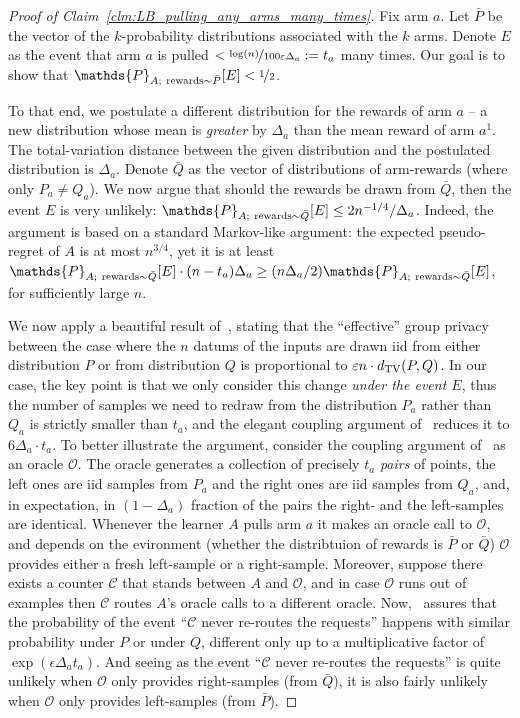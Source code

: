 \documentclass{article}
\renewcommand{\Pr}{\mathds{P}}
\begin{document}
\begin{proof}[Proof of Claim~\ref{clm:LB_pulling_any_arms_many_times}]
Fix arm $a$. Let $\bar P$ be the vector of the $k$-probability distributions associated with the $k$ arms. Denote $E$ as the event that arm $a$ is pulled $<\nicefrac{\log(n)}{100\varepsilon\Delta_a} := t_a$ many times. Our goal is to show that $\Pr_{A;~{\rm rewards}\sim \bar P}[E]<\nicefrac 1 2$.

To that end, we postulate a different distribution for the rewards of
arm $a$ -- a new distribution whose mean is \emph{greater} by
$\Delta_a$ than the mean reward of arm $a^1$. The total-variation
distance between the given distribution and the postulated
distribution is $\Delta_a$. Denote $\bar Q$ as the vector of
distributions of arm-rewards (where only $P_a \neq Q_a$). We now argue
that should the rewards be drawn from $\bar Q$, then the event $E$ is
very unlikely: $\Pr_{A;~{\rm rewards}\sim \bar Q}[E] \leq 2n^{-1/4}/\Delta_a$. Indeed, the argument is based on a standard Markov-like argument: the expected pseudo-regret of $A$ is at most $n^{3/4}$, yet it is at least $\Pr_{A;~{\rm rewards}\sim \bar Q}[E]\cdot (n-t_a) \Delta_a \geq  (n\Delta_a/2)\Pr_{A;~{\rm rewards}\sim \bar Q}[E]$, for sufficiently large $n$.


We now apply a beautiful result of~\citet[Lemma~6.1]{KarwaVadhanFiniteSampleDP2017}, stating that the ``effective'' group privacy between the case where the $n$ datums of the inputs are drawn iid from either distribution $P$ or from distribution $Q$ is proportional to $\varepsilon n\cdot d_{\rm TV}(P,Q)$. In our case, the key point is that we only consider this change \emph{under the event $E$}, thus the number of samples we need to redraw from the distribution $P_a$ rather than $Q_a$ is strictly smaller than $t_a$, and the elegant coupling argument of~\cite{KarwaVadhanFiniteSampleDP2017} reduces it to $6\Delta_a \cdot t_a$. To better illustrate the argument, consider the coupling argument of~\cite{KarwaVadhanFiniteSampleDP2017} as an oracle $\mathcal{O}$. The oracle generates a collection of precisely $t_a$ \emph{pairs} of points, the left ones are iid samples from $P_a$ and the right ones are iid samples from $Q_a$, and, in expectation, in $(1-\Delta_a)$ fraction of the pairs the right- and the left-samples are identical. Whenever the learner $A$ pulls arm $a$ it makes an oracle call to $\mathcal{O}$, and depends on the evironment (whether the distribtuion of rewards is $\bar P$ or $\bar Q$) $\mathcal{O}$ provides either a fresh left-sample or a right-sample. Moreover, suppose there exists a counter $\mathcal{C}$ that stands between $A$ and $\mathcal{O}$, and in case $\mathcal{O}$ runs out of examples then $\mathcal{C}$ routes $A$'s oracle calls to a different oracle. Now,~\citet[Lemma~6.1]{KarwaVadhanFiniteSampleDP2017} assures that the probability of the event ``$\mathcal{C}$ never re-routes the requests'' happens with similar probability under $P$ or under $Q$, different only up to a multiplicative factor of $\exp(\epsilon \Delta_a t_a)$. And seeing as the event ``$\mathcal{C}$ never re-routes the requests'' is quite unlikely when $\mathcal{O}$ only provides right-samples (from $\bar Q$), it is also fairly unlikely when $\mathcal{O}$ only provides left-samples (from $\bar P$).


\end{proof}
\end{document}
